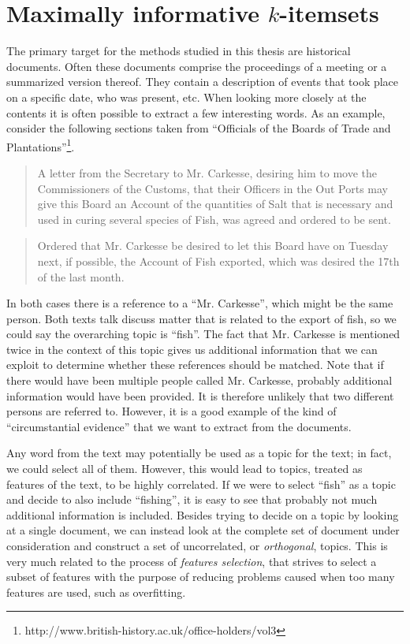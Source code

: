 

\section{Maximally informative $k$-itemsets}
\label{sec:miki}

The primary target for the methods studied in this thesis are historical documents.
Often these documents comprise the proceedings of a meeting or a summarized version thereof.
They contain a description of events that took place on a specific date, who was present, etc.
When looking more closely at the contents it is often possible to extract a few interesting words.
As an example, consider the following sections taken from ``Officials of the Boards of Trade and Plantations''\footnote{http://www.british-history.ac.uk/office-holders/vol3}.

\begin{quote}
    A letter from the Secretary to Mr. Carkesse, desiring him to move the Commissioners of the Customs, that their Officers in the Out Ports may give this Board an Account of the quantities of Salt that is necessary and used in curing several species of Fish, was agreed and ordered to be sent.
\end{quote}

\begin{quote}
    Ordered that Mr. Carkesse be desired to let this Board have on Tuesday next, if possible, the Account of Fish exported, which was desired the 17th of the last month.
\end{quote}

\noindent In both cases there is a reference to a ``Mr. Carkesse'', which might be the same person.
Both texts talk discuss matter that is related to the export of fish, so we could say the overarching topic is ``fish''.
The fact that Mr. Carkesse is mentioned twice in the context of this topic gives us additional information that we can exploit to determine whether these references should be matched.
Note that if there would have been multiple people called Mr. Carkesse, probably additional information would have been provided.
It is therefore unlikely that two different persons are referred to.
However, it is a good example of the kind of ``circumstantial evidence'' that we want to extract from the documents.

Any word from the text may potentially be used as a topic for the text; in fact, we could select all of them.
However, this would lead to topics, treated as features of the text, to be highly correlated.
If we were to select ``fish'' as a topic and decide to also include ``fishing'', it is easy to see that probably not much additional information is included.
Besides trying to decide on a topic by looking at a single document, we can instead look at the complete set of document under consideration and construct a set of uncorrelated, or \emph{orthogonal}, topics.
This is very much related to the process of \emph{features selection}, that strives to select a subset of features with the purpose of reducing problems caused when too many features are used, such as overfitting.


